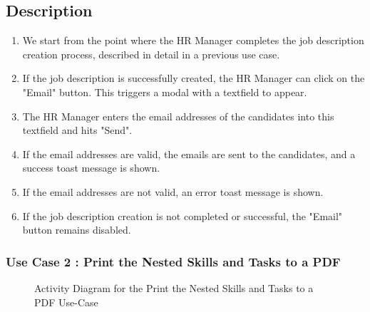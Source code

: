 \subsection*{Description}
\begin{enumerate}
    \item We start from the point where the HR Manager completes the job description creation process, described in detail in a previous use case.
    \item If the job description is successfully created, the HR Manager can click on the "Email" button. This triggers a modal with a textfield to appear.
    \item The HR Manager enters the email addresses of the candidates into this textfield and hits "Send".
    \item If the email addresses are valid, the emails are sent to the candidates, and a success toast message is shown.
    \item If the email addresses are not valid, an error toast message is shown.
    \item If the job description creation is not completed or successful, the "Email" button remains disabled.
\end{enumerate}


\subsubsection{Use Case 2 : Print the Nested Skills and Tasks to a PDF}


\begin{figure}[H]
    \centering
    \caption{ Activity Diagram for the Print the Nested Skills and Tasks to a PDF Use-Case }
    \label{fig:UseCase2Sprint3_Activity_Diagram}
\end{figure}

